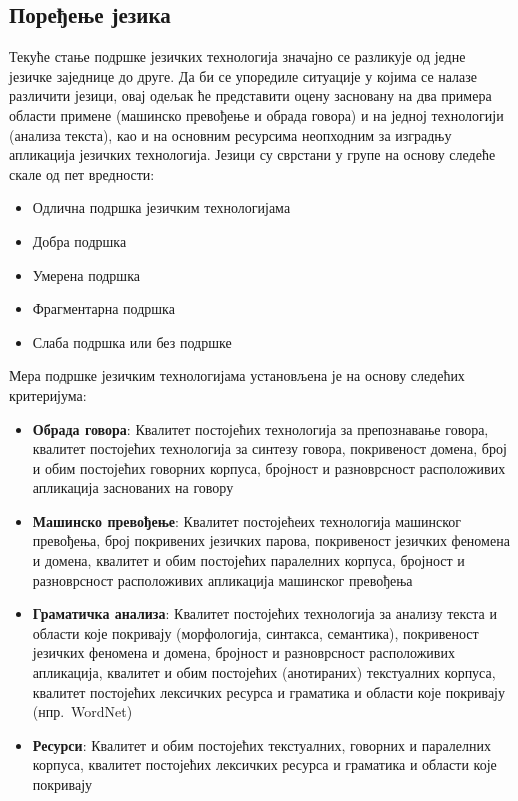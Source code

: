 \begin{multicols}{2}
 \subsection {Поређење језика}
   
Текуће стање подршке језичких технологија значајно се разликује од једне језичке заједнице до друге. Да би се упоредиле ситуације у којима се налазе различити језици, овај одељак ће представити оцену засновану на два примера области примене (машинско превођење и обрада говора) и на једној технологији (анализа текста), као и на основним ресурсима неопходним за изградњу апликација језичких технологија.
Језици су сврстани у групе на основу следеће скале од пет вредности:
\begin{itemize}
\item Одлична подршка језичким технологијама
\item Добра подршка
\item Умерена подршка
\item Фрагментарна подршка
\item Слаба подршка или без подршке 
\end{itemize}
Мера подршке језичким технологијама установљена је на основу следећих критеријума:
\begin{itemize}
\item \textbf{Обрада говора}: Квалитет постојећих технологија за препознавање говора, квалитет постојећих технологија за синтезу говора, покривеност домена, број и обим постојећих говорних корпуса, бројност и разноврсност расположивих апликација заснованих на говору
\item \textbf{Машинско превођење}: Квалитет постојећеих технологија машинског превођења, број покривених језичких парова, покривеност језичких феномена и домена, квалитет и обим постојећих паралелних корпуса, бројност и разноврсност расположивих апликација машинског превођења 
\item \textbf{Граматичка анализа}: Квалитет постојећих технологија за анализу текста и области које покривају (морфологија, синтакса, семантика), покривеност језичких феномена и домена, бројност и разноврсност расположивих апликација, квалитет и обим постојећих (анотираних) текстуалних корпуса, квалитет постојећих лексичких ресурса и граматика и области које покривају (нпр.~WordNet)
\item \textbf{Ресурси}: Квалитет и обим постојећих текстуалних, говорних и паралелних корпуса, квалитет постојећих лексичких ресурса и граматика и области које покривају
\end{itemize} 



\end{multicols}
